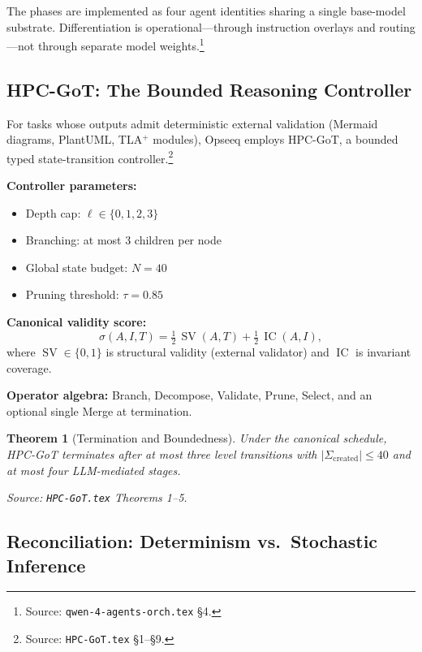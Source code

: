 \documentclass[11pt]{article}
\newtheorem{theorem}{Theorem}
\theoremstyle{remark}
\DeclareMathOperator{\SV}{SV}
\DeclareMathOperator{\IC}{IC}
\begin{document}
The phases are implemented as four agent identities sharing a single base-model substrate. Differentiation is operational---through instruction overlays and routing---not through separate model weights.\footnote{Source: \texttt{qwen-4-agents-orch.tex} \S4.}

\subsection{HPC-GoT: The Bounded Reasoning Controller}
\label{subsec:hpcgot}

For tasks whose outputs admit deterministic external validation (Mermaid diagrams, PlantUML, TLA$^+$ modules), Opseeq employs HPC-GoT, a bounded typed state-transition controller.\footnote{Source: \texttt{HPC-GoT.tex} \S1--\S9.}

\textbf{Controller parameters:}
\begin{itemize}
  \item Depth cap: $\ell \in \{0, 1, 2, 3\}$
  \item Branching: at most 3 children per node
  \item Global state budget: $N = 40$
  \item Pruning threshold: $\tau = 0.85$
\end{itemize}

\textbf{Canonical validity score:}
\begin{equation}
\sigma(A, I, T) = \tfrac{1}{2}\,\SV(A, T) + \tfrac{1}{2}\,\IC(A, I),
\end{equation}
where $\SV \in \{0, 1\}$ is structural validity (external validator) and $\IC$ is invariant coverage.

\textbf{Operator algebra:} Branch, Decompose, Validate, Prune, Select, and an optional single Merge at termination.

\begin{theorem}[Termination and Boundedness]
Under the canonical schedule, HPC-GoT terminates after at most three level transitions with $|\Sigma_{\mathrm{created}}| \le 40$ and at most four LLM-mediated stages.
\end{theorem}

\noindent\textit{Source: \texttt{HPC-GoT.tex} Theorems 1--5.}

\subsection{Reconciliation: Determinism vs.\ Stochastic Inference}
\label{subsec:reconcile_determinism}
\end{document}
